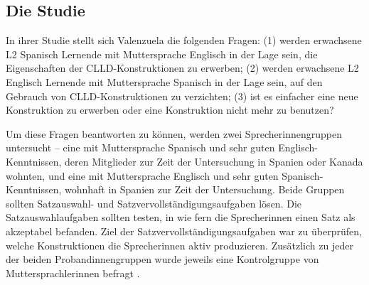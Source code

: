 \subsection{Die Studie}
In ihrer Studie stellt sich Valenzuela die folgenden Fragen:
(1) werden erwachsene L2 Spanisch Lernende mit Muttersprache Englisch in der Lage sein, die Eigenschaften der CLLD-Konstruktionen zu erwerben;
(2) werden erwachsene L2 Englisch Lernende mit Muttersprache Spanisch in der Lage sein, auf den Gebrauch von CLLD-Konstruktionen zu verzichten;
(3) ist es einfacher eine neue Konstruktion zu erwerben oder eine Konstruktion nicht mehr zu benutzen? \cite[vgl.][S.3]{Valenzuela05}


Um diese Fragen beantworten zu können, werden zwei Sprecherinnengruppen untersucht --
eine mit Muttersprache Spanisch und sehr guten Englisch-Kenntnissen, deren Mitglieder zur Zeit der Untersuchung in Spanien oder Kanada wohnten,
und eine mit Muttersprache Englisch und sehr guten Spanisch-Kenntnissen, wohnhaft in Spanien zur Zeit der Untersuchung.
Beide Gruppen sollten Satzauswahl- und Satzvervollständigungsaufgaben lösen.
Die Satzauswahlaufgaben sollten testen, in wie fern die Sprecherinnen einen Satz als akzeptabel befanden.
Ziel der Satzvervollständigungsaufgaben war zu überprüfen, welche Konstruktionen die Sprecherinnen aktiv produzieren.
Zusätzlich zu jeder der beiden Probandinnengruppen wurde jeweils eine Kontrolgruppe von Muttersprachlerinnen befragt \cite[S.4]{Valenzuela05}.


